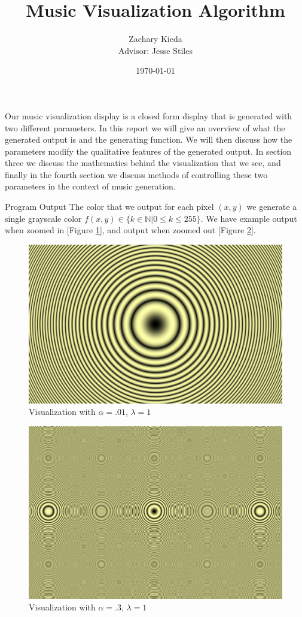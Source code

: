 \documentclass[11pt]{article}
\title{Music Visualization Algorithm}
\author{Zachary Kieda\\{Advisor: Jesse Stiles}}
\date{\today}
\newcommand{\reffig}[1]{[Figure \ref{#1}]}
\begin{document}
\maketitle

Our music visualization display is a closed form display that is generated with two different parameters. In this report we will give an overview of what the generated output is and the generating function. We will then discuss how the parameters modify the qualitative features of the generated output. In section three we discuss the mathematics behind the visualization that we see, and finally in the fourth section we discuss methods of controlling these two parameters in the context of music generation. 

\begin{section}{Program Output}
The color that we output for each pixel $(x, y)$ we generate a single grayscale color $f(x, y) \in \{k \in \mathbb{N}|0 \le k \le 255\}$. We have example output when zoomed in \reffig{fig:vizsmall}, and output when zoomed out \reffig{fig:vizlarge}. 

\begin{figure}[h]
\centering
\includegraphics[width=.9\textwidth]{viz-small.png}
\caption{Visualization with $\alpha = .01$, $\lambda = 1$}
\label{fig:vizsmall}
\end{figure}

\begin{figure}[h]
\centering
\includegraphics[width=.9\textwidth]{viz-large.png}
\caption{Visualization with $\alpha = .3$, $\lambda = 1$}
\label{fig:vizlarge}
\end{figure}


\end{section}
\end{document}
